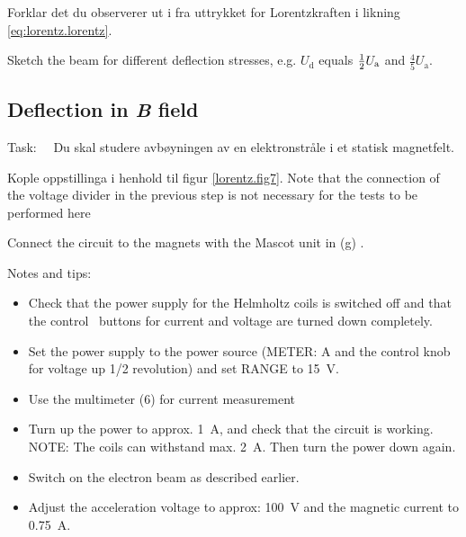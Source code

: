 \documentclass[../Elmag-labhefte-2020.tex]{subfiles}
\begin{document}
{\itsf Forklar det du observerer ut i fra uttrykket for Lorentzkraften i likning \eqref{eq:lorentz.lorentz}.

Sketch the beam for different deflection stresses, e.g. $U_\mathrm{d}$ equals $\frac{1}{2}  U_\mathrm{a}$ and $\frac{4}{5} U_\mathrm{a}$.
}

 
\subsection{Deflection in \textsl{B} field}

Task: \ \
{\itsf Du skal studere avbøyningen av en elektronstråle i et statisk magnetfelt.}


{\itsf Kople oppstillinga i henhold til figur \ref{lorentz.fig7}. Note that the connection of the voltage divider in the previous step is not necessary for the tests to be performed here}

{\itsf Connect the circuit to the magnets with the Mascot unit in (g)
.}


Notes and tips:
\vspace{-4mm}
\begin{itemize}
    \item Check that the power supply for the Helmholtz coils is switched off and that the control \ buttons for current and voltage are turned down completely.
    \item Set the power supply to the power source (METER: A and the control knob for voltage up 1/2 revolution) and set RANGE to \SI{15}{\volt}.
    \item Use the multimeter (6) for current measurement
    \item Turn up the power to approx. \SI{1}{\ampere}, and check that the circuit is working. NOTE: The coils can withstand max. \SI{2}{\ampere}. Then turn the power down again.
    \item Switch on the electron beam as described earlier.
    \item Adjust the acceleration voltage to approx: \SI{100}{\volt} and the magnetic current to \SI{0,75}{\ampere}.
\end{itemize}
\end{document}
